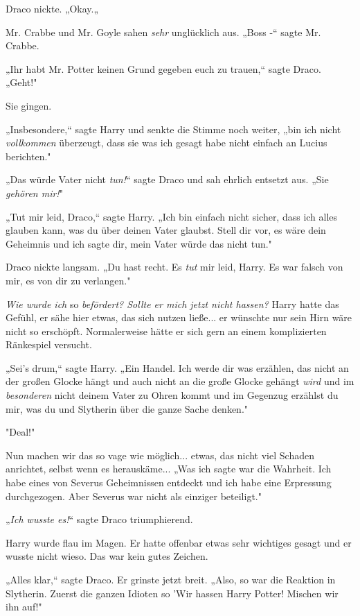 {Draco nickte. „Okay.„

Mr. Crabbe und Mr. Goyle sahen \emph{sehr} unglücklich aus. „Boss -“ sagte Mr. Crabbe.

„Ihr habt Mr. Potter keinen Grund gegeben euch zu trauen,“ sagte Draco. „Geht!"

Sie gingen.

„Insbesondere,“ sagte Harry und senkte die Stimme noch weiter, „bin ich nicht \emph{vollkommen} überzeugt, dass sie was ich gesagt habe nicht einfach an Lucius berichten."

„Das würde Vater nicht \emph{tun!}“ sagte Draco und sah ehrlich entsetzt aus. „Sie \emph{gehören mir!}"

„Tut mir leid, Draco,“ sagte Harry. „Ich bin einfach nicht sicher, dass ich alles glauben kann, was du über deinen Vater glaubst. Stell dir vor, es wäre dein Geheimnis und ich sagte dir, mein Vater würde das nicht tun."

Draco nickte langsam. „Du hast recht. Es \emph{tut} mir leid, Harry. Es war falsch von mir, es von dir zu verlangen."

\emph{Wie wurde ich} so \emph{befördert? Sollte er mich jetzt nicht hassen?} Harry hatte das Gefühl, er sähe hier etwas, das sich nutzen ließe... er wünschte nur sein Hirn wäre nicht so erschöpft. Normalerweise hätte er sich gern an einem komplizierten Ränkespiel versucht.

„Sei's drum,“ sagte Harry. „Ein Handel. Ich werde dir was erzählen, das nicht an der großen Glocke hängt und auch nicht an die große Glocke gehängt \emph{wird} und im \emph{besonderen} nicht deinem Vater zu Ohren kommt und im Gegenzug erzählst du mir, was du und Slytherin über die ganze Sache denken."

"Deal!"

Nun machen wir das so vage wie möglich... etwas, das nicht viel Schaden anrichtet, selbst wenn es herauskäme... „Was ich sagte war die Wahrheit. Ich habe eines von Severus Geheimnissen entdeckt und ich habe eine Erpressung durchgezogen. Aber Severus war nicht als einziger beteiligt."

„\emph{Ich wusste es!}“ sagte Draco triumphierend.

Harry wurde flau im Magen. Er hatte offenbar etwas sehr wichtiges gesagt und er wusste nicht wieso. Das war kein gutes Zeichen.

„Alles klar,“ sagte Draco. Er grinste jetzt breit. „Also, so war die Reaktion in Slytherin. Zuerst die ganzen Idioten so 'Wir hassen Harry Potter! Mischen wir ihn auf!"

}
